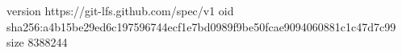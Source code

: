 version https://git-lfs.github.com/spec/v1
oid sha256:a4b15be29ed6c197596744ecf1e7bd0989f9be50fcae9094060881c1c47d7c99
size 8388244
